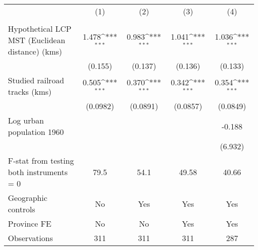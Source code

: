 {
\def\sym#1{\ifmmode^{#1}\else\(^{#1}\)\fi}
\begin{tabular}{l*{4}{c}}
\hline\hline
                &\multicolumn{1}{c}{(1)}&\multicolumn{1}{c}{(2)}&\multicolumn{1}{c}{(3)}&\multicolumn{1}{c}{(4)}\\
                &\multicolumn{1}{c}{}&\multicolumn{1}{c}{}&\multicolumn{1}{c}{}&\multicolumn{1}{c}{}\\
\hline
Hypothetical LCP MST (Euclidean distance) (kms)&    1.478\sym{***}&    0.983\sym{***}&    1.041\sym{***}&    1.036\sym{***}\\
                &  (0.155)         &  (0.137)         &  (0.136)         &  (0.133)         \\
[1em]
Studied railroad tracks (kms)&    0.505\sym{***}&    0.370\sym{***}&    0.342\sym{***}&    0.354\sym{***}\\
                & (0.0982)         & (0.0891)         & (0.0857)         & (0.0849)         \\
[1em]
Log urban population 1960&                  &                  &                  &   -0.188         \\
                &                  &                  &                  &  (6.932)         \\
\hline
F-stat from testing both instruments = 0&     79.5         &     54.1         &    49.58         &    40.66         \\
Geographic controls&       No         &      Yes         &      Yes         &      Yes         \\
Province FE     &       No         &       No         &      Yes         &      Yes         \\
Observations    &      311         &      311         &      311         &      287         \\
\hline\hline
\end{tabular}
}
